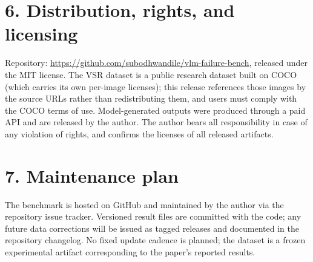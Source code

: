 \documentclass[11pt]{article}
\begin{document}
\section*{6. Distribution, rights, and licensing}
Repository: \url{https://github.com/subodhwandile/vlm-failure-bench},
released under the MIT license. The VSR dataset is a public research
dataset built on COCO (which carries its own per-image licenses); this
release references those images by the source URLs rather than
redistributing them, and users must comply with the COCO terms of use.
Model-generated outputs were produced through a paid API and are released
by the author. The author bears all responsibility in case of any
violation of rights, and confirms the licenses of all released artifacts.

\section*{7. Maintenance plan}
The benchmark is hosted on GitHub and maintained by the author via the
repository issue tracker. Versioned result files are committed with the
code; any future data corrections will be issued as tagged releases and
documented in the repository changelog. No fixed update cadence is
planned; the dataset is a frozen experimental artifact corresponding to
the paper's reported results.
\end{document}

